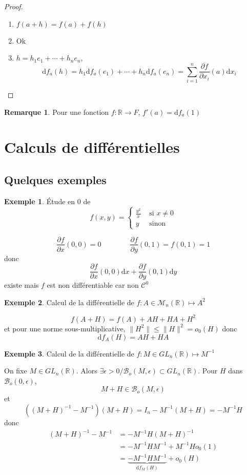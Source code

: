 \documentclass{article}
\theoremstyle{definition}
\newtheorem*{rem}{Remarque}
\newtheorem*{ex}{Exemple}
\begin{document}
\begin{proof} ~
\begin{enumerate}
    \item $f(a+h)=f(a)+f(h)$
    \item Ok
    \item $h=h_1e_1+\cdots +h_ne_n$, \[
        \mathrm df_a(h)=h_1\mathrm df_a(e_1)+\cdots +h_n\mathrm df_a(e_n)=\sum_{i=1}^n\frac{\partial f}{\partial x_i}(a)\mathrm dx_i
    \]
\end{enumerate}
\end{proof}

\begin{rem}
Pour une fonction $f:\mathbb R\longrightarrow F$, $f'(a)=\mathrm df_a(1)$
\end{rem}

\section{Calculs de différentielles}

\subsection{Quelques exemples}
\begin{ex} Étude en $0$ de
\[
    f(x, y)=\begin{cases}
    \frac{y^2}x &\text{ si }x\neq 0\\ y & \text{ sinon}
    \end{cases}
\]
\end{ex}

\[
\frac{\partial f}{\partial x}(0, 0)=0 \qquad\qquad \frac{\partial f}{\partial y}(0, 1)=f(0, 1)=1
\]
donc \[
\frac{\partial f}{\partial x}(0, 0) \mathrm dx+ \frac{\partial f}{\partial y}(0, 1)\mathrm dy
\]
existe mais $f$ est non différentiable car non $\mathcal C^0$

\begin{ex} Calcul de la différentielle de
{$f:A\in\mathcal M_n(\mathbb R)\longmapsto A^2$}
\end{ex}

\[
    f(A+H)=f(A)+AH+HA+H^2
\]
et pour une norme sous-multiplicative, $\|H^2\|\leq \|H\|^2=o_0(H)$ donc \[
    \mathrm df_A(H)=AH+HA
\]

\begin{ex} Calcul de la différentielle de
{$f:M\in GL_n(\mathbb R)\longmapsto M^{-1}$}
\end{ex}

On fixe $M\in GL_n(\mathbb R)$. Alors $\exists \epsilon >0 / \mathcal B_o(M, \epsilon)\subset GL_n(\mathbb R)$. Pour $H$ dans $\mathcal B_o(0, \epsilon)$, \[
    M+H\in\mathcal B_o(M, \epsilon)
\]
et \[
    \left((M+H)^{-1}-M^{-1}\right)(M+H)=I_n-M^{-1}(M+H)=-M^{-1}H
    \] donc
    \begin{align*}
    (M+H)^{-1}-M^{-1}&=-M^{-1}H(M+H)^{-1}\\&=-M^{-1}HM^{-1}+M^{-1}Ho_0(1)\\&=\underbrace{-M^{-1}HM^{-1}}_{\mathrm df_M(H)}+o_0(H)
\end{align*}
\end{document}
